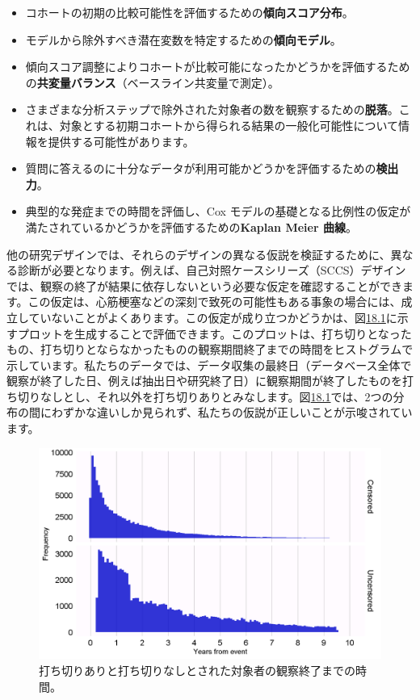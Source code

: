 \documentclass[
  11pt]{book}
\theoremstyle{definition}
\theoremstyle{definition}
\theoremstyle{definition}
\theoremstyle{definition}
\theoremstyle{remark}
\begin{document}
\begin{itemize}
\item
  コホートの初期の比較可能性を評価するための\textbf{傾向スコア分布}。
\item
  モデルから除外すべき潜在変数を特定するための\textbf{傾向モデル}。
\item
  傾向スコア調整によりコホートが比較可能になったかどうかを評価するための\textbf{共変量バランス}（ベースライン共変量で測定）。
\item
  さまざまな分析ステップで除外された対象者の数を観察するための\textbf{脱落}。これは、対象とする初期コホートから得られる結果の一般化可能性について情報を提供する可能性があります。
\item
  質問に答えるのに十分なデータが利用可能かどうかを評価するための\textbf{検出力}。
\item
  典型的な発症までの時間を評価し、Cox モデルの基礎となる比例性の仮定が満たされているかどうかを評価するための\textbf{Kaplan Meier 曲線}。
\end{itemize}

他の研究デザインでは、それらのデザインの異なる仮説を検証するために、異なる診断が必要となります。例えば、自己対照ケースシリーズ（SCCS）デザインでは、観察の終了が結果に依存しないという必要な仮定を確認することができます。この仮定は、心筋梗塞などの深刻で致死の可能性もある事象の場合には、成立していないことがよくあります。この仮定が成り立つかどうかは、図\href{https://ohdsi.github.io/TheBookOfOhdsi/MethodValidity.html\#fig:timeToObsEnd}{18.1}に示すプロットを生成することで評価できます。このプロットは、打ち切りとなったもの、打ち切りとならなかったものの観察期間終了までの時間をヒストグラムで示しています。私たちのデータでは、データ収集の最終日（データベース全体で観察が終了した日、例えば抽出日や研究終了日）に観察期間が終了したものを打ち切りなしとし、それ以外を打ち切りありとみなします。図\href{https://ohdsi.github.io/TheBookOfOhdsi/MethodValidity.html\#fig:timeToObsEnd}{18.1}では、2つの分布の間にわずかな違いしか見られず、私たちの仮説が正しいことが示唆されています。

\begin{figure}

{\centering \includegraphics[width=1\linewidth]{images/MethodValidity/timeToObsEnd} 

}

\caption{打ち切りありと打ち切りなしとされた対象者の観察終了までの時間。}\label{fig:timeToObsEnd}
\end{figure}
\end{document}

